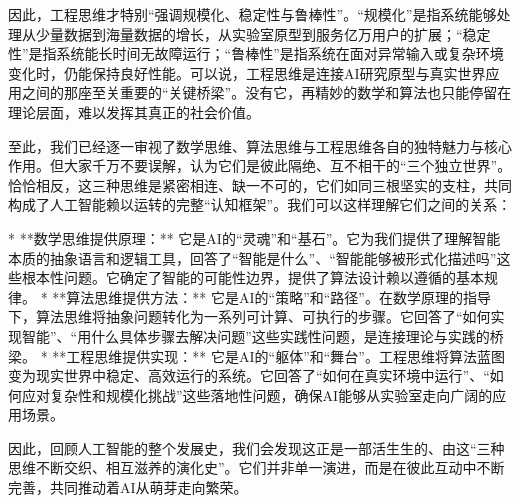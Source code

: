 因此，工程思维才特别“强调规模化、稳定性与鲁棒性”。“规模化”是指系统能够处理从少量数据到海量数据的增长，从实验室原型到服务亿万用户的扩展；“稳定性”是指系统能长时间无故障运行；“鲁棒性”是指系统在面对异常输入或复杂环境变化时，仍能保持良好性能。可以说，工程思维是连接AI研究原型与真实世界应用之间的那座至关重要的“关键桥梁”。没有它，再精妙的数学和算法也只能停留在理论层面，难以发挥其真正的社会价值。



至此，我们已经逐一审视了数学思维、算法思维与工程思维各自的独特魅力与核心作用。但大家千万不要误解，认为它们是彼此隔绝、互不相干的“三个独立世界”。恰恰相反，这三种思维是紧密相连、缺一不可的，它们如同三根坚实的支柱，共同构成了人工智能赖以运转的完整“认知框架”。我们可以这样理解它们之间的关系：

*   **数学思维提供原理：** 它是AI的“灵魂”和“基石”。它为我们提供了理解智能本质的抽象语言和逻辑工具，回答了“智能是什么”、“智能能够被形式化描述吗”这些根本性问题。它确定了智能的可能性边界，提供了算法设计赖以遵循的基本规律。
*   **算法思维提供方法：** 它是AI的“策略”和“路径”。在数学原理的指导下，算法思维将抽象问题转化为一系列可计算、可执行的步骤。它回答了“如何实现智能”、“用什么具体步骤去解决问题”这些实践性问题，是连接理论与实践的桥梁。
*   **工程思维提供实现：** 它是AI的“躯体”和“舞台”。工程思维将算法蓝图变为现实世界中稳定、高效运行的系统。它回答了“如何在真实环境中运行”、“如何应对复杂性和规模化挑战”这些落地性问题，确保AI能够从实验室走向广阔的应用场景。

因此，回顾人工智能的整个发展史，我们会发现这正是一部活生生的、由这“三种思维不断交织、相互滋养的演化史”。它们并非单一演进，而是在彼此互动中不断完善，共同推动着AI从萌芽走向繁荣。




